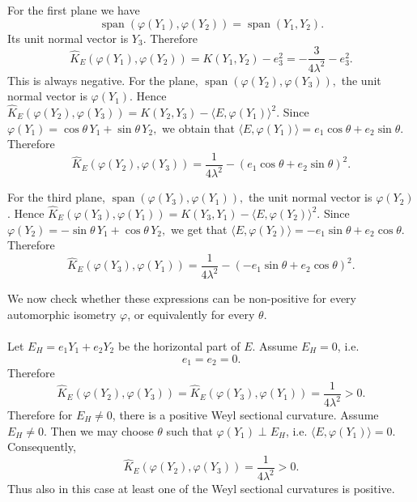 \documentclass[12pt]{article}
\begin{document}
For the first plane we have
\[
\operatorname{span}(\varphi(Y_1),\varphi(Y_2))
=
\operatorname{span}(Y_1,Y_2).
\]
Its unit normal vector is \(Y_3\). Therefore
\[
\widehat K_E(\varphi(Y_1),\varphi(Y_2))= K(Y_1,Y_2)-e_3^2 = -\frac{3}{4\lambda^2}-e_3^2.
\]
This  is always negative. For the plane, $\operatorname{span}(\varphi(Y_2),\varphi(Y_3)),$ the unit normal vector is \(\varphi(Y_1)\). Hence $\widehat K_E(\varphi(Y_2),\varphi(Y_3)) = K(Y_2,Y_3)-\langle E,\varphi(Y_1)\rangle^2.$ Since $\varphi(Y_1)=\cos\theta\,Y_1+\sin\theta\,Y_2,$ we obtain that $\langle E,\varphi(Y_1)\rangle=e_1\cos\theta+e_2\sin\theta$.
Therefore
\[
\widehat K_E(\varphi(Y_2),\varphi(Y_3))=\frac{1}{4\lambda^2}-(e_1\cos\theta+e_2\sin\theta)^2.
\]

For the third plane, $\operatorname{span}(\varphi(Y_3),\varphi(Y_1)),$
the unit normal vector is \(\varphi(Y_2)\). Hence $\widehat K_E(\varphi(Y_3),\varphi(Y_1))=K(Y_3,Y_1)-\langle E,\varphi(Y_2)\rangle^2.$
Since $\varphi(Y_2)=-\sin\theta\,Y_1+\cos\theta\,Y_2,$ we get that $\langle E,\varphi(Y_2)\rangle=-e_1\sin\theta+e_2\cos\theta$.
Therefore
\[
\widehat K_E(\varphi(Y_3),\varphi(Y_1))
=
\frac{1}{4\lambda^2}
-
(-e_1\sin\theta+e_2\cos\theta)^2.
\]

We now check whether these expressions can be non-positive for every
automorphic isometry \(\varphi\), or equivalently for every \(\theta\). \\~\\
Let $E_H=e_1Y_1+e_2Y_2$
be the horizontal part of \(E\). Assume \(E_H=0\), i.e.
\[
e_1=e_2=0.
\]
Therefore
\[
\widehat K_E(\varphi(Y_2),\varphi(Y_3))=\widehat K_E(\varphi(Y_3),\varphi(Y_1))=\frac{1}{4\lambda^2}>0.
\]
Therefore for $E_H \neq 0$, there is a positive Weyl sectional curvature. Assume \(E_H\neq 0\). Then we may choose \(\theta\) such that $\varphi(Y_1)\perp E_H$, i.e. $\langle E,\varphi(Y_1)\rangle=0.$ Consequently,
\[
\widehat K_E(\varphi(Y_2),\varphi(Y_3))
=
\frac{1}{4\lambda^2}>0.
\]
Thus also in this case at least one of the Weyl sectional curvatures is
positive.
\end{document}
